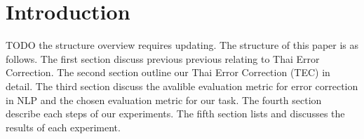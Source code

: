 \section{Introduction}

TODO the structure overview requires updating.
The structure of this paper is as follows. The first section discuss previous previous relating to Thai Error Correction. The second section outline our Thai Error Correction (TEC) in detail. The third section discuss the avalible evaluation metric for error correction in NLP and the chosen evaluation metric for our task. The fourth section describe each steps of our experiments. The fifth section lists and discusses the results of each experiment.
